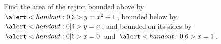 \begin{frame}
\begin{example}%
Find the area of the region bounded above by $\alert<handout:0| 3>{y = x^2 + 1}$, bounded below by $\alert<handout:0| 4>{y = x}$, and bounded on its sides by $\alert<handout:0| 6>{x = 0}$ and $\alert<handout:0| 6>{x = 1}$.
\begin{columns}
\ %
%  
\end{columns}
\end{example}
\end{frame}
